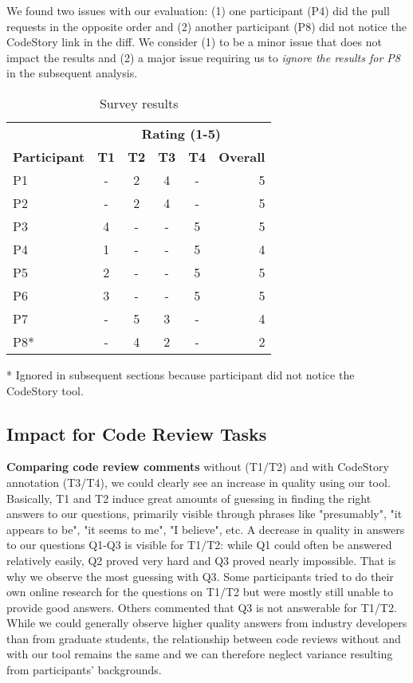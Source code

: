 \documentclass[../manifest.tex]{subfiles}
\begin{document}
We found two issues with our evaluation: (1) one participant (P4) did the pull requests in the opposite order and (2) another participant (P8) did not notice the CodeStory link in the diff. We consider (1) to be a minor issue that does not impact the results and (2) a major issue requiring us to \textit{ignore the results for P8} in the subsequent analysis.

\begin{table}[t]
    \centering
    \begin{threeparttable}
    \begin{tabular}{lccccr}
    \hline
    & \multicolumn{5}{c}{\textbf{Rating (1-5)}} \\
        \cline{2-6}
    \textbf{Participant} & \textbf{T1} & \textbf{T2} & \textbf{T3} & \textbf{T4} & \textbf{Overall} \\
    \hline
    P1  & - & 2 & 4 & - & 5 \\
    P2  & - & 2 & 4 & - & 5 \\
    P3  & 4 & - & - & 5 & 5 \\
    P4  & 1 & - & - & 5 & 4 \\
    P5  & 2 & - & - & 5 & 5 \\
    P6  & 3 & - & - & 5 & 5 \\
    P7  & - & 5 & 3 & - & 4 \\
    P8* & - & 4 & 2 & - & 2 \\
    \hline
    \end{tabular}
    \begin{tablenotes}\footnotesize
      \item [*] Ignored in subsequent sections because participant did not notice the CodeStory tool.
    \end{tablenotes}
    \end{threeparttable}
    \caption{Survey results}
    \label{tab:survey-results}
\end{table}

\subsection{Impact for Code Review Tasks} \label{eval-impact}

\textbf{Comparing code review comments} without (T1/T2) and with CodeStory annotation (T3/T4), we could clearly see an increase in quality using our tool. Basically, T1 and T2 induce great amounts of guessing in finding the right answers to our questions, primarily visible through phrases like "presumably", "it appears to be", "it seems to me", "I believe", etc. A decrease in quality in answers to our questions Q1-Q3 is visible for T1/T2: while Q1 could often be answered relatively easily, Q2 proved very hard and Q3 proved nearly impossible. That is why we observe the most guessing with Q3. Some participants tried to do their own online research for the questions on T1/T2 but were mostly still unable to provide good answers. Others commented that Q3 is not answerable for T1/T2. While we could generally observe higher quality answers from industry developers than from graduate students, the relationship between code reviews without and with our tool remains the same and we can therefore neglect variance resulting from participants' backgrounds.
\end{document}
